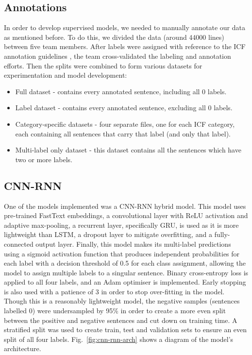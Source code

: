 \subsection{Annotations}

In order to develop supervised models, we needed to manually annotate our data as mentioned before. To do this, we divided the data (around 44000 lines) between five team members. After labels were assigned with reference to the ICF annotation guidelines \cite{CommCognitionGuideline2023} \cite{MobilityGuideline2023} \cite{InterpersonalGuideline2023}, the team cross-validated the labeling and annotation efforts. Then the splits were combined to form various datasets for experimentation and model development:

\begin{itemize}
    \item Full dataset - contains every annotated sentence, including all 0 labels.
    \item Label dataset - contains every annotated sentence, excluding all 0 labels.
    \item Category-specific datasets - four separate files, one for each ICF category, each containing all sentences that carry that label (and only that label).
    \item Multi-label only dataset - this dataset contains all the sentences which have two or more labels.
\end{itemize}

\subsection{CNN-RNN}

One of the models implemented was a CNN-RNN hybrid model. This model uses pre-trained FastText embeddings, a convolutional layer with ReLU activation and adaptive max-pooling, a recurrent layer, specifically GRU, is used as it is more lightweight than LSTM, a dropout layer to mitigate overfitting, and a fully-connected output layer. Finally, this model makes its multi-label predictions using a sigmoid activation function that produces independent probabilities for each label with a decision threshold of 0.5 for each class assignment, allowing the model to assign multiple labels to a singular sentence. Binary cross-entropy loss is applied to all four labels, and an Adam optimiser is implemented. Early stopping is also used with a patience of 3 in order to stop over-fitting in the model. Though this is a reasonably lightweight model, the negative samples (sentences labelled 0) were undersampled by 95\% in order to create a more even split between the positive and negative sentences and cut down on training time. A stratified split was used to create train, test and validation sets to ensure an even split of all four labels. Fig.~\ref{fig:cnn-rnn-arch} shows a diagram of the model's architecture. \\

